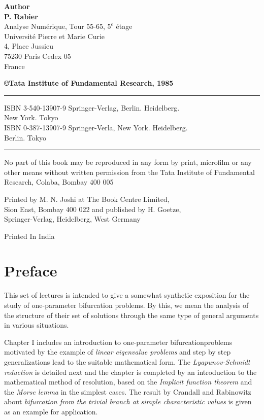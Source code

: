 \begin{center}
{\bf Author}\\
{\large\bf P. Rabier}\\
Analyse Num\'erique, Tour 55-65, $5^e$ \'etage\\
Universit\'e Pierre et Marie Curie\\
4, Place Jussieu\\
75230 Paris Cedex 05\\
France

\vfill

{\bf\copyright \quad Tata Institute of Fundamental Research, 1985}
\vfill

\noindent\rule{\textwidth}{1pt}
 
ISBN 3-540-13907-9 Springer-Verlag, Berlin. Heidelberg.\\ New York. Tokyo\\

ISBN 0-387-13907-9 Springer-Verla, New York. Heidelberg.\\ Berlin. Tokyo

\noindent\rule{\textwidth}{1pt}

\vfill

\parbox{0.7\textwidth}{No part of this book may be reproduced in any form
by print, microfilm or any other means without
 written permission from the Tata Institute of 
Fundamental Research, Colaba, Bombay 400 005}
\vfill

Printed by M. N. Joshi at The Book Centre Limited,\\
Sion East, Bombay 400 022 and published by H. Goetze,\\
Springer-Verlag, Heidelberg, West Germany\\
\vfill

Printed In India
\end{center}


\chapter{Preface}


This set of lectures is intended to give a somewhat synthetic exposition for the study of one-parameter bifurcation problems. By this, we mean the analysis of the structure of their set of solutions through the same type of general arguments in various situations.

Chapter I includes an introduction to one-parameter bifurcation\break problems motivated by the example of {\em linear eiqenvalue problems} and step by step generalizations lead to the suitable mathematical form. The {\em Lyapunov-Schmidt reduction} is detailed next and the chapter is completed by an introduction to the mathematical method of resolution, based on the {\em Implicit function theorem} and  the {\em Morse lemma} in the simplest cases. The result by Crandall and Rabinowitz \cite{7} about {\em bifurcation from the trivial branch at simple characteristic values} is given as an example for application.

